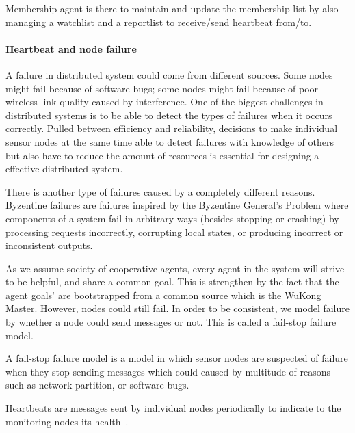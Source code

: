 Membership agent is there to maintain and update the membership list by
also managing a watchlist and a reportlist to receive/send heartbeat from/to.

\paragraph{Heartbeat and node failure}


A failure in distributed system could come from different sources. Some nodes
might fail because of software bugs; some nodes might fail because of poor
wireless link quality caused by interference. One of the biggest challenges in
distributed systems is to be able to detect the types of failures when it
occurs correctly. Pulled between efficiency and reliability, decisions to make
individual sensor nodes at the same time able to detect failures with knowledge
of others but also have to reduce the amount of resources is essential for
designing a effective distributed system.


There is another type of failures caused by a completely different reasons.
Byzentine failures are failures inspired by the Byzentine General's Problem
where components of a system fail in arbitrary ways (besides stopping or
crashing) by processing requests incorrectly, corrupting local states, or
producing incorrect or inconsistent outputs.


As we assume society of cooperative agents, every agent in the system will
strive to be helpful, and share a common goal. This is strengthen by the fact
that the agent goals' are bootstrapped from a common source which is the WuKong
Master. However, nodes could still fail. In order to be consistent, we model
failure by whether a node could send messages or not. This is called
a fail-stop failure model.


A fail-stop failure model is a model in which sensor nodes are suspected of
failure when they stop sending messages which could caused by multitude of
reasons such as network partition, or software bugs.


Heartbeats are messages sent by individual nodes periodically to indicate to
the monitoring nodes its health~\cite{}.

